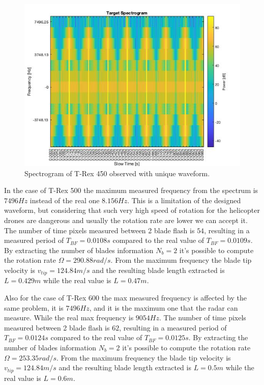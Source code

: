 \begin{figure}[h!]
\centering
\includegraphics[width=12cm]{FMCW mD analysis-chap4/img/trex450_result_spect_unique_waveform.jpg}
\caption{Spectrogram of T-Rex 450 observed with unique waveform.}
\label{t-rex-unique-wave-ft}
\end{figure}

In the case of T-Rex 500 the maximum measured frequency from the spectrum is $7496 Hz$ instead of the real one $8.156Hz$. This is a limitation of the designed waveform, but considering that such very high speed of rotation for the helicopter drones are dangerous and usually the rotation rate are lower we can accept it. The number of time pixels measured between 2 blade flash is $54$, resulting in a measured period of $T_{BF} = 0.0108s$ compared to the real value of $T_{BF} = 0.0109s$. By extracting the number of blades information $N_{b} = 2$ it's possible to compute the rotation rate $\Omega = 290.88 rad/s$. From the maximum frequency the blade tip velocity is $v_{tip}= 124.84 m/s$ and the resulting blade length extracted is $L=0.429m$ while the real value is $L = 0.47m$.


Also for the case of T-Rex 600 the max measured frequency is affected by the same problem, it is $7496 Hz$, and it is the maximum one that the radar can measure. While the real max frequency is $9054 Hz$. The number of time pixels measured between 2 blade flash is $62$, resulting in a measured period of $T_{BF} = 0.0124s$ compared to the real value of $T_{BF} = 0.0125s$. By extracting the number of blades information $N_{b} = 2$ it's possible to compute the rotation rate $\Omega = 253.35 rad/s$. From the maximum frequency the blade tip velocity is $v_{tip}= 124.84 m/s$ and the resulting blade length extracted is $L=0.5m$ while the real value is $L = 0.6m$. 

